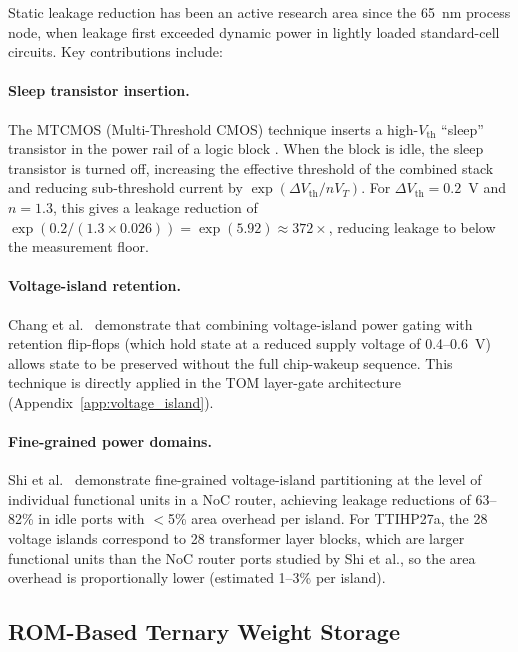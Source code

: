 Static leakage reduction has been an active research area since the
65~nm process node, when leakage first exceeded dynamic power in
lightly loaded standard-cell circuits.  Key contributions include:

\paragraph{Sleep transistor insertion.}
The MTCMOS (Multi-Threshold CMOS) technique inserts a high-\(V_{\mathrm{th}}\)
``sleep'' transistor in the power rail of a logic block
\cite{chang_power_gating_2006}.  When the block is idle, the sleep
transistor is turned off, increasing the effective threshold of the
combined stack and reducing sub-threshold current by
\(\exp(\Delta V_{\mathrm{th}} / n V_T)\).  For \(\Delta V_{\mathrm{th}} = 0.2\)~V
and \(n = 1.3\), this gives a leakage reduction of
\(\exp(0.2 / (1.3 \times 0.026)) = \exp(5.92) \approx 372\times\),
reducing leakage to below the measurement floor.

\paragraph{Voltage-island retention.}
Chang et al.\ \cite{chang_power_gating_2006} demonstrate that combining
voltage-island power gating with retention flip-flops (which hold state
at a reduced supply voltage of 0.4--0.6~V) allows state to be preserved
without the full chip-wakeup sequence.  This technique is directly
applied in the TOM layer-gate architecture (Appendix~\ref{app:voltage_island}).

\paragraph{Fine-grained power domains.}
Shi et al.\ \cite{shi_voltage_island_2014} demonstrate fine-grained
voltage-island partitioning at the level of individual functional units
in a NoC router, achieving leakage reductions of 63--82\% in idle ports
with \(<\)5\% area overhead per island.  For TTIHP27a, the 28 voltage
islands correspond to 28 transformer layer blocks, which are larger
functional units than the NoC router ports studied by Shi et al., so
the area overhead is proportionally lower (estimated 1--3\% per island).

\subsection{ROM-Based Ternary Weight Storage}

